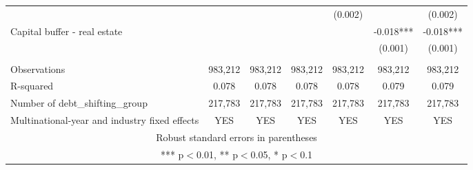 \begin{tabular}{lcccccc}
 &  &  &  & (0.002) &  & (0.002) \\
Capital buffer - real estate &  &  &  &  & -0.018*** & -0.018*** \\
 &  &  &  &  & (0.001) & (0.001) \\
 &  &  &  &  &  &  \\
Observations & 983,212 & 983,212 & 983,212 & 983,212 & 983,212 & 983,212 \\
R-squared & 0.078 & 0.078 & 0.078 & 0.078 & 0.079 & 0.079 \\
Number of debt\_shifting\_group & 217,783 & 217,783 & 217,783 & 217,783 & 217,783 & 217,783 \\
 Multinational-year and industry fixed effects & YES & YES & YES & YES & YES & YES \\ \hline
\multicolumn{7}{c}{ Robust standard errors in parentheses} \\
\multicolumn{7}{c}{ *** p$<$0.01, ** p$<$0.05, * p$<$0.1} \\
\end{tabular}
